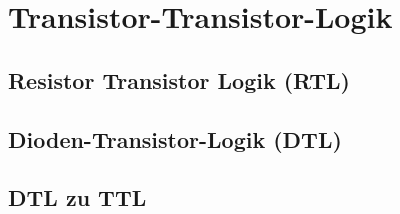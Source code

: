 \section{Transistor-Transistor-Logik}



\subsection{Resistor Transistor Logik (RTL)}


\subsection{Dioden-Transistor-Logik (DTL)}


\subsection{DTL zu TTL}
